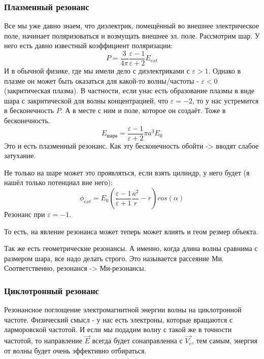 \documentclass[10pt, a4paper]{article}
\begin{document}
\subsubsection{Плазменный резонанс}
Все мы уже давно знаем, что диэлектрик, помещённый во внешнее электрическое поле, начинает поляризоваться и возмущать внешнее эл. поле. Рассмотрим шар. У него есть давно известный коэффициент поляризации:
\begin{equation}
	P=\frac{3}{4\pi}\frac{\varepsilon - 1}{\varepsilon + 2} E_{ext}
\end{equation}
И в обычной физике, где мы имели дело с диэлектриками с $\varepsilon>1$. Однако в плазме он может быть оказаться для какой-то волны/частоты - $\varepsilon<0$ (закритическая плазма). В частности, если  унас есть образование плазмы в виде шара с закритической для волны концентрацией, что $\varepsilon = -2$, то у нас устремится в бесконечность $P$. А в месте с ним и поле, которое он создаёт. Тоже в бесконечность.
\begin{equation}
	E_{\text{шара}}=\frac{\varepsilon - 1}{\varepsilon + 2} \pi a^3 E_0
\end{equation}
Это и есть плазменный резонанс. Как эту бесконечность обойти -> вводят слабое затухание.



Не только на шаре может это проявляться, если взять цилиндр, у него будет (я нашёл только потенциал вне него):
\begin{equation}
	\phi_{ext}=E_0(\frac{\varepsilon-1}{\varepsilon+1} \frac{a^2}{r} - r) cos(\alpha)
\end{equation}
Резонанс при $\varepsilon=-1$.

То есть, на явление резонанса может теперь может влиять и геом резмер объекта.

Так же есть геометрические резонансы. А именно, когда длина волны сравнима с размером шара, все надо делать строго. Это называется рассеяние Ми. Соответственно, резонанся -> Ми-резонансы.


\subsubsection{Циклотронный резонанс}
Резонансное поглощение электромагнитной энергии волны на циклотронной частоте.
Физический смысл - у нас есть электроны, которые вращаются с ларморовской частотой. И если мы подадим волну с такой же в точности частотой, то направление $\vec E$ всегда будет сонаправленна с $\vec{V_e}$, тем самым, энергия от волны будет очень эффективно отбираться.
\end{document}
